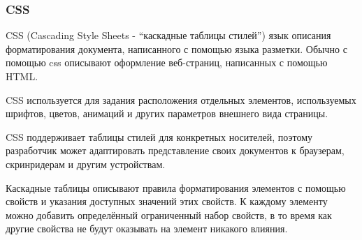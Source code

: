 \subsubsection{CSS}

CSS (Cascading Style Sheets - ``каскадные таблицы стилей'') язык описания форматирования документа, написанного с помощью языка разметки. Обычно с помощью css описывают оформление веб-страниц, написанных с помощью HTML.

CSS используется для задания расположения отдельных элементов, используемых шрифтов, цветов, анимаций и других параметров внешнего вида страницы.

CSS поддерживает таблицы стилей для конкретных носителей, поэтому разработчик может адаптировать представление своих документов к браузерам, скринридерам и другим устройствам.

Каскадные таблицы описывают правила форматирования элементов с помощью свойств и указания доступных значений этих свойств. К каждому элементу можно добавить определённый ограниченный набор свойств, в то время как другие свойства не будут оказывать на элемент никакого влияния.